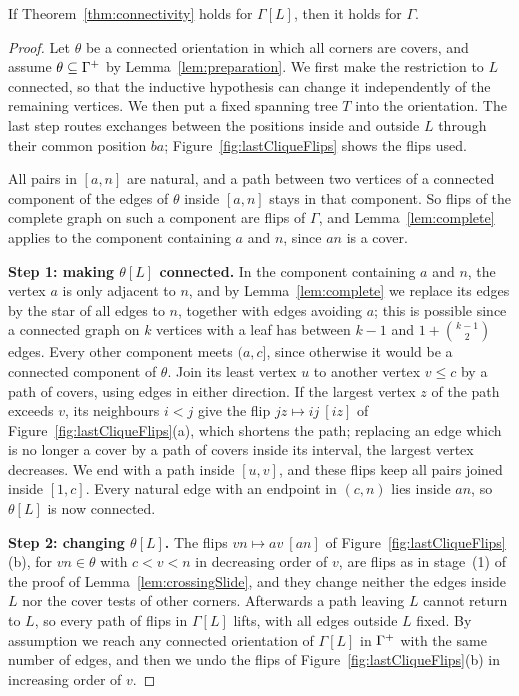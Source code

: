 \begin{lemma}\label{lem:lastClique}
If Theorem~\ref{thm:connectivity} holds for $\Gamma[L]$, then it holds for
$\Gamma$.
\end{lemma}

\begin{proof}
Let $\theta$ be a connected orientation in which all corners are covers, and
assume $\theta\subseteq\Gamma^{+}$ by Lemma~\ref{lem:preparation}.
We first make the restriction to $L$ connected, so that the inductive
hypothesis can change it independently of the remaining vertices.
We then put a fixed spanning tree $T$ into the orientation.
The last step routes exchanges between the positions inside and outside $L$
through their common position $ba$; Figure~\ref{fig:lastCliqueFlips} shows the
flips used.

All pairs in $[a,n]$ are natural, and a path between two vertices of a connected
component of the edges of $\theta$ inside $[a,n]$ stays in that component.
So flips of the complete graph on such a component are flips of $\Gamma$, and
Lemma~\ref{lem:complete} applies to the component containing $a$ and $n$, since
$an$ is a cover.

\smallskip\noindent\textbf{Step 1: making $\theta[L]$ connected.}
In the component containing $a$ and $n$, the vertex $a$ is only adjacent to $n$,
and by Lemma~\ref{lem:complete} we replace its edges by the star of all edges to
$n$, together with edges avoiding $a$; this is possible since a connected graph
on $k$ vertices with a leaf has between $k-1$ and $1+\binom{k-1}{2}$ edges.
Every other component meets $(a,c]$, since otherwise it would be a connected
component of $\theta$.
Join its least vertex $u$ to another vertex $v\leq c$ by a path of covers, using
edges in either direction.
If the largest vertex $z$ of the path exceeds $v$, its neighbours $i<j$ give the
flip $jz\mapsto ij\ [iz]$ of Figure~\ref{fig:lastCliqueFlips}(a), which shortens the
path; replacing an edge which is no longer a cover by a path of covers inside its
interval, the largest vertex decreases.
We end with a path inside $[u,v]$, and these flips keep all pairs joined inside
$[1,c]$.
Every natural edge with an endpoint in $(c,n)$ lies inside $an$, so $\theta[L]$
is now connected.

\smallskip\noindent\textbf{Step 2: changing $\theta[L]$.}
The flips $vn\mapsto av\ [an]$ of Figure~\ref{fig:lastCliqueFlips}(b), for
$vn\in\theta$ with $c<v<n$ in decreasing order of $v$, are flips as in stage~(1)
of the proof of Lemma~\ref{lem:crossingSlide}, and they change neither the edges
inside $L$ nor the cover tests of other corners.
Afterwards a path leaving $L$ cannot return to $L$, so every path of flips in
$\Gamma[L]$ lifts, with all edges outside $L$ fixed.
By assumption we reach any connected orientation of $\Gamma[L]$ in $\Gamma^{+}$ with
the same number of edges, and then we undo the flips of
Figure~\ref{fig:lastCliqueFlips}(b) in increasing order of $v$.


\end{proof}

